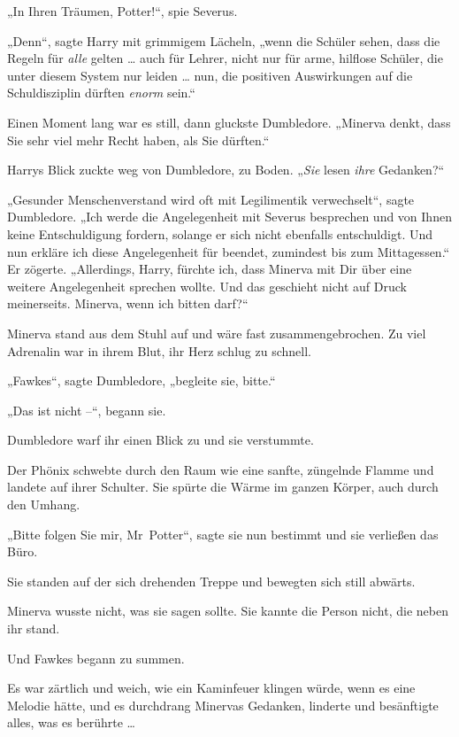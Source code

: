 {„In Ihren Träumen, Potter!“, spie Severus.

„Denn“, sagte Harry mit grimmigem Lächeln, „wenn die Schüler sehen, dass die Regeln für \emph{alle} gelten … auch für Lehrer, nicht nur für arme, hilflose Schüler, die unter diesem System nur leiden … nun, die positiven Auswirkungen auf die Schuldisziplin dürften \emph{enorm} sein.“

Einen Moment lang war es still, dann gluckste Dumbledore. „Minerva denkt, dass Sie sehr viel mehr Recht haben, als Sie dürften.“

Harrys Blick zuckte weg von Dumbledore, zu Boden. „\emph{Sie} lesen \emph{ihre} Gedanken?“

„Gesunder Menschenverstand wird oft mit Legilimentik verwechselt“, sagte Dumbledore. „Ich werde die Angelegenheit mit Severus besprechen und von Ihnen keine Entschuldigung fordern, solange er sich nicht ebenfalls entschuldigt. Und nun erkläre ich diese Angelegenheit für beendet, zumindest bis zum Mittagessen.“ Er zögerte. „Allerdings, Harry, fürchte ich, dass Minerva mit Dir über eine weitere Angelegenheit sprechen wollte. Und das geschieht nicht auf Druck meinerseits. Minerva, wenn ich bitten darf?“

Minerva stand aus dem Stuhl auf und wäre fast zusammengebrochen. Zu viel Adrenalin war in ihrem Blut, ihr Herz schlug zu schnell.

„Fawkes“, sagte Dumbledore, „begleite sie, bitte.“

„Das ist nicht --“, begann sie.

Dumbledore warf ihr einen Blick zu und sie verstummte.

Der Phönix schwebte durch den Raum wie eine sanfte, züngelnde Flamme und landete auf ihrer Schulter. Sie spürte die Wärme im ganzen Körper, auch durch den Umhang.

„Bitte folgen Sie mir, Mr~Potter“, sagte sie nun bestimmt und sie verließen das Büro.

\later

Sie standen auf der sich drehenden Treppe und bewegten sich still abwärts.

Minerva wusste nicht, was sie sagen sollte. Sie kannte die Person nicht, die neben ihr stand.

Und Fawkes begann zu summen.

Es war zärtlich und weich, wie ein Kaminfeuer klingen würde, wenn es eine Melodie hätte, und es durchdrang Minervas Gedanken, linderte und besänftigte alles, was es berührte …

}
